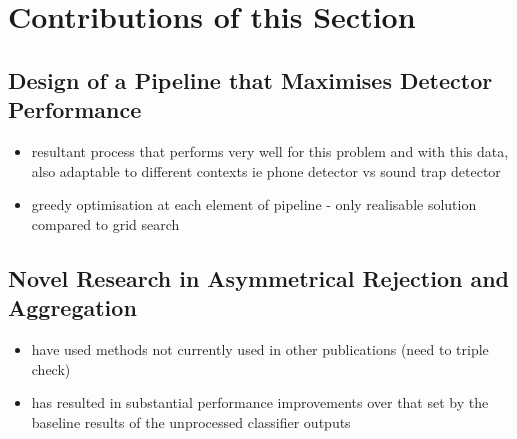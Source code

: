 \section{Contributions of this Section}
\label{sec:exp-overview}
    
    \subsection{Design of a Pipeline that Maximises Detector Performance}
    \label{subsec:exp-overview-detect}
        \begin{itemize}
            \item{resultant process that performs very well for this problem and with this data, also adaptable to different contexts ie phone detector vs sound trap detector}
            \item{greedy optimisation at each element of pipeline - only realisable solution compared to grid search}
        \end{itemize}
    
    \subsection{Novel Research in Asymmetrical Rejection and Aggregation}
    \label{subsec:exp-overview-novel}
        \begin{itemize}
            \item{have used methods not currently used in other publications (need to triple check)}
            \item{has resulted in substantial performance improvements over that set by the baseline results of the unprocessed classifier outputs}
        \end{itemize}
    
  